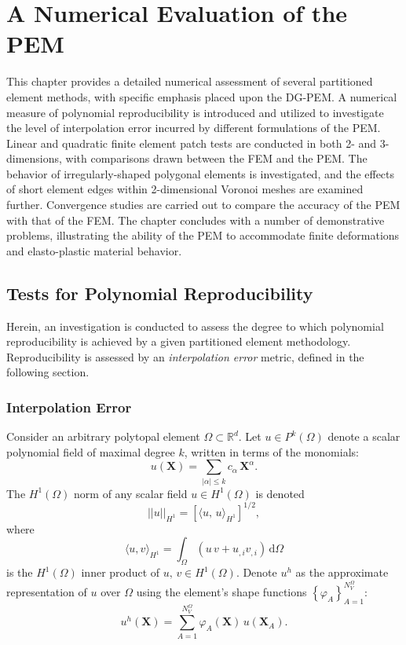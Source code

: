 \chapter{A Numerical Evaluation of the PEM} \label{ch:results}
%
This chapter provides a detailed numerical assessment of several partitioned element methods, with specific emphasis placed upon the DG-PEM. A numerical measure of polynomial reproducibility is introduced and utilized to investigate the level of interpolation error incurred by different formulations of the PEM. Linear and quadratic finite element patch tests are conducted in both 2- and 3-dimensions, with comparisons drawn between the FEM and the PEM. The behavior of irregularly-shaped polygonal elements is investigated, and the effects of short element edges within 2-dimensional Voronoi meshes are examined further. Convergence studies are carried out to compare the accuracy of the PEM with that of the FEM. The chapter concludes with a number of demonstrative problems, illustrating the ability of the PEM to accommodate finite deformations and elasto-plastic material behavior.

\section{Tests for Polynomial Reproducibility}

Herein, an investigation is conducted to assess the degree to which polynomial reproducibility is achieved by a given partitioned element methodology. Reproducibility is assessed by an \textit{interpolation error} metric, defined in the following section.

\subsection*{Interpolation Error}

Consider an arbitrary polytopal element $\Omega \subset \mathbb{R}^d$. Let $u \in P^k (\Omega)$ denote a scalar polynomial field of maximal degree $k$, written in terms of the monomials:
\begin{equation}
        u (\bm{X}) = \sum_{|\alpha| \leq k} c_{\alpha} \, \bm{X}^{\alpha}.
\end{equation}
The $H^1(\Omega)$ norm of any scalar field $u \in H^1(\Omega)$ is denoted
\begin{equation}
        ||u||_{H^1} = \left[ \langle u, \, u \rangle_{H^1} \right]^{1/2},
\end{equation}
where
\begin{equation}
       \langle u,v \rangle_{H^1} = \int_{\Omega} (u \, v + u_{,i} v_{,i}) \, \mathrm d\Omega
\end{equation}
is the $H^1(\Omega)$ inner product of $u, \,v \in H^1(\Omega)$. Denote $u^h$ as the approximate representation of $u$ over $\Omega$ using the element's shape functions $\left\{ \varphi_A \right\}_{A=1}^{N^\Omega_V}$:
\begin{equation}
        u^h (\bm{X}) = \sum_{A = 1}^{N^{\Omega}_V} \varphi_A (\bm{X}) \, u(\bm{X}_A).
\end{equation}

